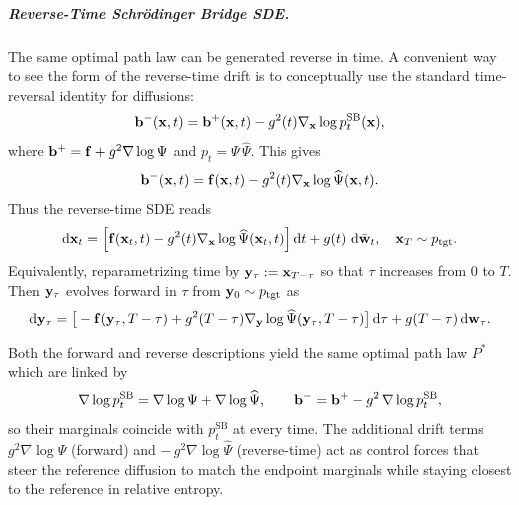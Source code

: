 \subparagraph{Reverse-Time Schrödinger Bridge SDE.}
The same optimal path law can be generated reverse in time. A convenient way
to see the form of the reverse-time drift is to conceptually use the standard time-reversal identity for diffusions:
\[
{\mathbf{b}}^{-}({\mathbf{x}},t)={\mathbf{b}}^{+}({\mathbf{x}},t)-g^2(t)\nabla_{\mathbf{x}}\log p_t^{\mathrm{SB}}({\mathbf{x}}),
\]
where ${\mathbf{b}}^{+}={\mathbf{f}}+g^2\nabla\log\Psi$ and $p_t=\Psi\,\widehat{\Psi}$. This gives
\[
{\mathbf{b}}^{-}({\mathbf{x}},t)={\mathbf{f}}({\mathbf{x}},t)-g^2(t) \nabla_{\mathbf{x}}\log \widehat{\Psi}({\mathbf{x}},t).
\]
Thus the reverse-time SDE reads
\begin{align}\label{eq:sb-backward-sde}
\mathop{}\!\mathrm{d} {\mathbf{x}}_t
= \Big[{\mathbf{f}}({\mathbf{x}}_t,t) - g^2(t) \nabla_{{\mathbf{x}}}\log \widehat{\Psi}({\mathbf{x}}_t,t)\Big]\mathop{}\!\mathrm{d} t
+ g(t)\,\mathop{}\!\mathrm{d} \bar{{\mathbf{w}}}_t, \quad {\mathbf{x}}_T \sim p_{\mathrm{tgt}} .
\end{align}
Equivalently, reparametrizing time by ${\mathbf{y}}_\tau := {\mathbf{x}}_{T-\tau}$ so that
$\tau$ increases from $0$ to $T$. Then ${\mathbf{y}}_\tau$ evolves forward in $\tau$ from ${\mathbf{y}}_0 \sim p_{\mathrm{tgt}}$ as
\begin{align}\label{eq:sb-reverse-forward-tau}
\begin{aligned}
    \mathop{}\!\mathrm{d} {\mathbf{y}}_\tau
= \big[-{\mathbf{f}}({\mathbf{y}}_\tau,T-\tau) + g^2(T-\tau) \nabla_{{\mathbf{y}}}\log \widehat{\Psi}({\mathbf{y}}_\tau,T-\tau)\big]\mathop{}\!\mathrm{d} \tau
+ g(T-\tau) \mathop{}\!\mathrm{d} {\mathbf{w}}_\tau.
\end{aligned}
\end{align}



Both the forward and reverse descriptions yield the same optimal path law $P^*$ which are linked by
\[
\nabla\log p_t^{\mathrm{SB}}=\nabla\log\Psi+\nabla\log\widehat\Psi,
\qquad
{\mathbf{b}}^{-}={\mathbf{b}}^{+}-g^2\,\nabla\log p_t^{\mathrm{SB}},
\]
so their marginals coincide with $p_t^{\mathrm{SB}}$ at every time.  The additional drift terms $g^2\nabla\log\Psi$ (forward) and
$-\,g^2\nabla\log\widehat{\Psi}$ (reverse-time) act as control forces that steer
the reference diffusion to match the endpoint marginals while staying closest
to the reference in relative entropy.





